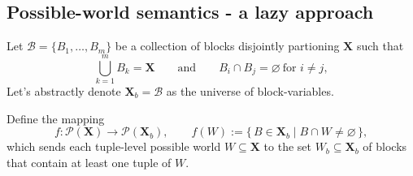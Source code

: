 \subsection{Possible-world semantics - a lazy approach}
\begin{proposition}
Let
  $\mathcal{B} = \{B_1,\dots,B_m\}$ be a collection of blocks disjointly partioning $\mathbf{X}$ such that
\[
\bigcup_{k=1}^m B_k = \mathbf{X}
\qquad\text{and}\qquad
B_i\cap B_j=\varnothing\ \text{for }i\neq j,
\]
Let's abstractly denote $\mathbf{X}_b=\mathcal{B}$ as the universe of block-variables.

Define the mapping
\[
f:\mathcal{P}(\mathbf{X})\longrightarrow \mathcal{P}(\mathbf{X}_b),\qquad
f(W):=\{\,B\in\mathbf{X}_b \mid B\cap W\neq\varnothing\,\},
\]
which sends each tuple-level possible world $W\subseteq\mathbf{X}$ to the
set $W_b\subseteq\mathbf{X}_b$ of blocks that contain at least one tuple of
$W$.


\end{proposition}
